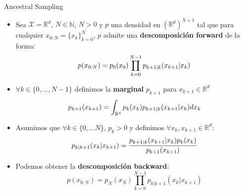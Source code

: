 \documentclass[aspectratio=169,xcolor=dvipsnames, t, spanish]{beamer}
\begin{document}
    \begin{frame}{Ancestral Sampling}\vspace{-6mm}
        \begin{itemize}
            \item Sea $\mathcal{X} = \mathbb{R}^d$, $N\in\mathbb{N}$, $N>0$ y $p$ una densidad en $(\mathbb{R}^{d})^{N+1}$ tal que para cualquier $x_{0:N}=\{x_{k}\}_{k=0}^{N}$, $p$ admite una \textbf{descomposición forward} de la forma:\vspace{-3mm}
            \[ p(x_{0:N})=p_{0}(x_{0})\prod_{k=0}^{N-1}p_{k+1|k}(x_{k+1}|x_{k}) \vspace{-2mm}\]
            \pause\item $\forall k\in\{0,...,N-1\}$ definimos la \textbf{marginal} $p_{k+1}$ para $x_{k+1}\in\mathbb{R}^{d}$\vspace{-1mm}
            \[ p_{k+1}(x_{k+1})=\int_{\mathbb{R}^{d}}p_{k}(x_{k})p_{k+1|k}(x_{k+1}|x_{k})dx_{k} \vspace{-2mm}\]
            \pause\item Asumimos que $\forall k\in\{0,...N\}$, $p_{k}>0$ y definimos $\forall x_{k},x_{k+1}\in\mathbb{R}^{d}$:\vspace{-1mm}
            \[ p_{k|k+1}(x_{k}|x_{k+1})=\frac{p_{k+1|k}(x_{k+1}|x_{k})p_{k}(x_{k})}{p_{k+1}(x_{k+1})}\vspace{-2mm} \]
            \pause\item Podemos obtener la \textbf{descomposición backward}:\vspace{-2mm}
            \[ p(x_{0:N})=p_{N}(x_{N})\prod_{k=0}^{N-1}p_{k|k+1}(x_{k}|x_{k+1}) \]
        \end{itemize}
    \end{frame}
    
\end{document}
